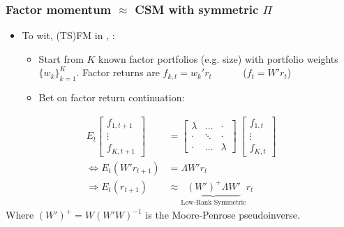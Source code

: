 \documentclass[10pt]{beamer}
\begin{document}
\begin{frame}[label=fm_as_sym_explanation]
    \frametitle{Factor momentum $\approx$ CSM with symmetric $\Pi$}

\begin{itemize}
    \item To wit, (TS)FM in {\scriptsize \citet{gupta2019factor}, \citet{arnott2023factor}}:
\begin{itemize}
    \item Start from $K$ known factor portfolios (e.g. size) with portfolio weights $\{w_k\}_{k=1}^K$. Factor returns are $f_{k,t} = w_k' r_{t}$ ~~~~~ ($f_t = W' r_t$)

    \item Bet on factor return continuation:
\end{itemize}
\end{itemize}
\begin{align*}
    E_t\begin{bmatrix}f_{1,t+1} \\ \vdots \\ f_{K,t+1} \end{bmatrix} & = \begin{bmatrix} \lambda & \ldots & \cdot \\
    \cdot & \ddots & \cdot \\
    \cdot & \ldots & \lambda
    \end{bmatrix} ~ \begin{bmatrix}f_{1,t} \\ \vdots \\ f_{K,t} \end{bmatrix} \\
    \Leftrightarrow E_t(W' r_{t+1}) & = \Lambda W' r_t \\
    \Rightarrow E_t(r_{t+1}) & \approx \underbrace{(W')^{+} \Lambda W'}_\text{Low-Rank Symmetric} r_t
\end{align*}
\footnotesize{Where $(W')^{+} = W(W'W)^{-1}$ is the Moore-Penrose pseudoinverse.}\hfill \hyperlink{sym_as_fm}{}
\end{frame}

\backupend
\end{document}
